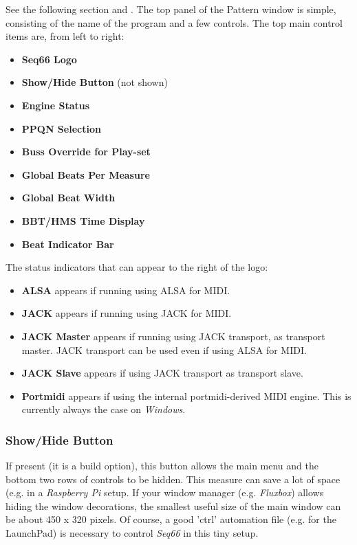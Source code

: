    See the following section and
   .
   The top panel of the Pattern window is simple, consisting of the
   name of the program and a few controls.
   The top main control items are, from left to right:

   \begin{itemize}
      \item \textbf{Seq66 Logo}
      \item \textbf{Show/Hide Button} (not shown)
      \item \textbf{Engine Status}
      \item \textbf{PPQN Selection}
      \item \textbf{Buss Override for Play-set}
      \item \textbf{Global Beats Per Measure}
      \item \textbf{Global Beat Width}
      \item \textbf{BBT/HMS Time Display}
      \item \textbf{Beat Indicator Bar}
   \end{itemize}

   The status indicators that can appear to the right of the logo:

   \begin{itemize}
      \item \textbf{ALSA} appears if running using ALSA for MIDI.
      \item \textbf{JACK} appears if running using JACK for MIDI.
      \item \textbf{JACK Master} appears if running using JACK transport, as
         transport master.
         JACK transport can be used even if using ALSA for MIDI.
      \item \textbf{JACK Slave} appears if using JACK transport as
         transport slave.
      \item \textbf{Portmidi} appears if using the internal portmidi-derived
         MIDI engine.  This is currently always the case on \textsl{Windows}.
   \end{itemize}

\subsubsection{Show/Hide Button}
\label{subsubsec:introduction_show_hide_button}

   If present (it is a build option),
   this button allows the main menu and the bottom two
   rows of controls to be hidden.
   This measure can save a lot of space (e.g. in a \textsl{Raspberry Pi}
   setup.
   If your window manager (e.g. \textsl{Fluxbox})
   allows hiding the window decorations, the smallest useful size of the
   main window can be about 450 x 320 pixels.
   Of course, a good 'ctrl' automation file (e.g. for the LaunchPad)
   is necessary to control \textsl{Seq66} in this tiny setup.

